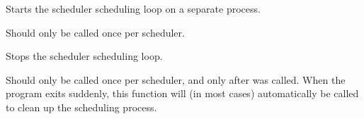 \documentclass[letterpaper,10pt,english]{sphinxmanual}
\begin{document}
\begin{fulllineitems}
\begin{fulllineitems}
\begin{quote}
\begin{description}
\end{description}\end{quote}

\end{fulllineitems}


\begin{fulllineitems}
\label{\detokenize{periodic_tasks.task_scheduler:periodic_tasks.task_scheduler.TaskScheduler.start}}
Starts the scheduler scheduling loop on a separate process.

Should only be called once per scheduler.

%
\begin{sphinxVerbatim}[commandchars=\\\{\}]
   
  
\end{sphinxVerbatim}

\end{fulllineitems}


\begin{fulllineitems}
\label{\detokenize{periodic_tasks.task_scheduler:periodic_tasks.task_scheduler.TaskScheduler.stop}}
Stops the scheduler scheduling loop.

Should only be called once per scheduler, and only after  was called.
When the program exits suddenly, this function will (in most cases) automatically be called
to clean up the scheduling process.

%
\begin{sphinxVerbatim}[commandchars=\\\{\}]
   
  
\end{sphinxVerbatim}

\end{fulllineitems}


\end{fulllineitems}
\end{document}

